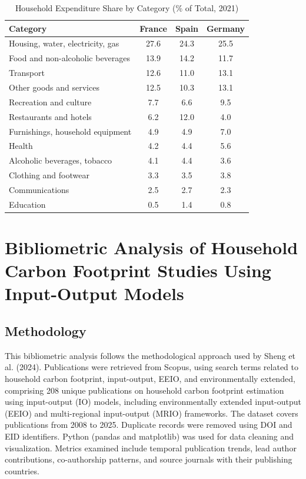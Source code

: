 \documentclass[12pt,a4paper]{article}%
\begin{document}
\begin{table}[h]
\centering
\caption{Household Expenditure Share by Category (\% of Total, 2021)}\label{tab:appendix_expenditure}
\begin{tabular}{lccc}
\hline
\textbf{Category} & \textbf{France} & \textbf{Spain} & \textbf{Germany}\\
\hline
Housing, water, electricity, gas & 27.6 & 24.3 & 25.5\\
Food and non-alcoholic beverages & 13.9 & 14.2 & 11.7\\
Transport & 12.6 & 11.0 & 13.1\\
Other goods and services & 12.5 & 10.3 & 13.1\\
Recreation and culture & 7.7 & 6.6 & 9.5\\
Restaurants and hotels & 6.2 & 12.0 & 4.0\\
Furnishings, household equipment & 4.9 & 4.9 & 7.0\\
Health & 4.2 & 4.4 & 5.6\\
Alcoholic beverages, tobacco & 4.1 & 4.4 & 3.6\\
Clothing and footwear & 3.3 & 3.5 & 3.8\\
Communications & 2.5 & 2.7 & 2.3\\
Education & 0.5 & 1.4 & 0.8\\
\hline
\end{tabular}
\end{table}

\section{Bibliometric Analysis of Household Carbon Footprint Studies Using Input-Output Models}

\subsection{Methodology}

This bibliometric analysis follows the methodological approach used by Sheng et al. (2024). Publications were retrieved from Scopus, using search terms related to household carbon footprint, input-output, EEIO, and environmentally extended, comprising 208 unique publications on household carbon footprint estimation using input-output (IO) models, including environmentally extended input-output (EEIO) and multi-regional input-output (MRIO) frameworks. The dataset covers publications from 2008 to 2025. Duplicate records were removed using DOI and EID identifiers. Python (pandas and matplotlib) was used for data cleaning and visualization. Metrics examined include temporal publication trends, lead author contributions, co-authorship patterns, and source journals with their publishing countries.
\end{document}

